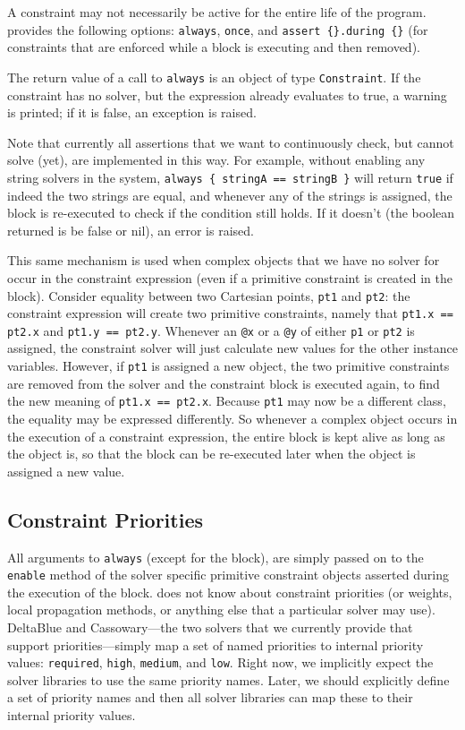 A constraint may not necessarily be active for the entire life of the
program.  \langname provides the following options:
\lstinline{always}, \lstinline{once}, and
\lstinline!assert {}.during {}! (for constraints that are enforced
while a block is executing and then removed).

The return value of a call to \lstinline{always} is an object of type
\lstinline{Constraint}. If the constraint has no solver, but the
expression already evaluates to true, a warning is printed; if it is
false, an exception is raised.

Note that currently all assertions that we want to continuously check,
but cannot solve (yet), are implemented in this way. For example, without
enabling any string solvers in the system, 
\lstinline!always { stringA == stringB }! will return \lstinline{true} 
if indeed the two strings
are equal, and whenever any of the strings is assigned, the block is
re-executed to check if the condition still holds. If it doesn't (the
boolean returned is be false or nil), an error is raised.

This same mechanism is used when complex objects that we have no
solver for occur in the constraint expression (even if a primitive
constraint is created in the block). Consider equality between two
Cartesian points, \lstinline{pt1} and \lstinline{pt2}: the constraint
expression will create two primitive constraints, namely that
\lstinline{pt1.x == pt2.x} and \lstinline{pt1.y == pt2.y}. Whenever an
\lstinline{@x} or a \lstinline{@y} of either \lstinline{p1} or
\lstinline{pt2} is assigned, the constraint solver will just calculate
new values for the other instance variables. However, if
\lstinline{pt1} is assigned a new object, the two primitive
constraints are removed from the solver and the constraint block is
executed again, to find the new meaning of \lstinline{pt1.x == pt2.x}.
Because \lstinline{pt1} may now be a different class, the equality may
be expressed differently. So whenever a complex object occurs in the
execution of a constraint expression, the entire block is kept alive
as long as the object is, so that the block can be re-executed later
when the object is assigned a new value.

\subsection{Constraint Priorities}

All arguments to \lstinline{always} (except for the block), are simply
passed on to the \lstinline{enable} method of the solver specific
primitive constraint objects asserted during the execution of the
block. \toolname does not know about constraint priorities (or
weights, local propagation methods, or anything else that a particular
solver may use). DeltaBlue and Cassowary---the two solvers that we
currently provide that support priorities---simply map a set of named
priorities to internal priority values: \lstinline{required},
\lstinline{high}, \lstinline{medium}, and \lstinline{low}. Right
now, we implicitly expect the solver libraries to use the same
priority names. Later, we should explicitly define a set of priority
names and then all solver libraries can map these to their internal
priority values.

